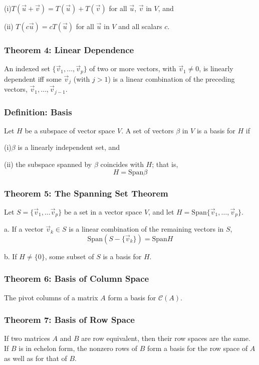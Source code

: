\documentclass{article}
\begin{document}
(i)\hspace{6pt}$T(\vec u + \vec v) = T(\vec u) + T(\vec v)$ \hspace{12 pt} for all $\vec u$, $\vec v$ in $V$, and

(ii) $T(c\vec u) = cT(\vec u)$ \hspace{53 pt} for all $\vec u$ in $V$ and all scalars $c$. 

\subsubsection*{Theorem 4: Linear Dependence}
An indexed set $\{ \vec v_1 , \dots , \vec v_p \}$ of two or more vectors, with $\vec v_1 \neq 0$, is linearly dependent iff some $\vec v_j$ (with $j > 1$) is a linear combination of the preceding vectors, $\vec v_1, \dots , \vec v_{j-1}$.

\subsubsection*{Definition: Basis}
Let $H$ be a subspace of vector space $V$. A set of vectors $\beta$ in $V$ is a basis for $H$ if

(i)\hspace{6pt}$\beta$ is a linearly independent set, and

(ii) the subspace spanned by $\beta$ coincides with $H$; that is,
$$H = \textrm{Span} \beta$$

\subsubsection*{Theorem 5: The Spanning Set Theorem}
Let $S = \{ \vec v_1 , \dots \vec v_p \}$ be a set in a vector space $V$, and let $H = \text{Span}\{ \vec v_1 ,\dots, \vec v_p \}$. 

a. If a vector $\vec v_k \in S$ is a linear combination of the remaining vectors in $S$, $$\text{Span}(S - \{\vec v_k\}) = \text{Span}H$$

b. If $H \neq \{ 0 \}$, some subset of $S$ is a basis for $H$.

\subsubsection*{Theorem 6: Basis of Column Space}
The pivot columns of a matrix $A$ form a basis for $\mathcal{C}(A)$.

\subsubsection*{Theorem 7: Basis of Row Space}
If two matrices $A$ and $B$ are row equivalent, then their row spaces are the same. If $B$ is in echelon form, the nonzero rows of $B$ form a basis for the row space of $A$ as well as for that of $B$. 
\end{document}
